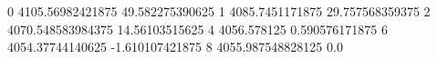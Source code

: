 0 4105.56982421875 49.582275390625
1 4085.7451171875 29.757568359375
2 4070.548583984375 14.56103515625
4 4056.578125 0.590576171875
6 4054.37744140625 -1.610107421875
8 4055.987548828125 0.0
